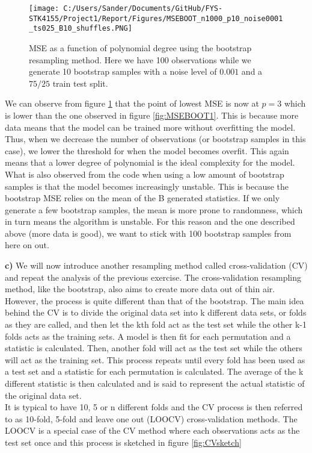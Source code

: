 \documentclass[12pt,a4paper]{article}
\begin{document}
\begin{figure}[H]
\centering
\texttt{[image: C:/Users/Sander/Documents/GitHub/FYS-STK4155/Project1/Report/Figures/MSEBOOT\_n1000\_p10\_noise0001\_ts025\_B10\_shuffles.PNG]}
\caption{\label{fig:MSEBOOT2} MSE as a function of polynomial degree using the bootstrap resampling method. Here we have 100 observations while we generate 10 bootstrap samples with a noise level of $0.001$ and a $75/25$ train test split.}
\end{figure}

\noindent We can observe from figure \ref{fig:MSEBOOT2} that the point of lowest MSE is now at $p = 3$ which is lower than the one observed in figure \ref{fig:MSEBOOT1}. This is because more data means that the model can be trained more without overfitting the model. Thus, when we decrease the number of observations (or bootstrap samples in this case), we lower the threshold for when the model becomes overfit. This again means that a lower degree of polynomial is the ideal complexity for the model. 
\\
What is also observed from the code when using a low amount of bootstrap samples is that the model becomes increasingly unstable. This is because the bootstrap MSE relies on the mean of the B generated statistics. If we only generate a few bootstrap samples, the mean is more prone to randomness, which in turn means the algorithm is unstable. For this reason and the one described above (more data is good), we want to stick with 100 bootstrap samples from here on out.

\newpage

\noindent \textbf{c)} We will now introduce another resampling method called cross-validation (CV) and repeat the analysis of the previous exercise. The cross-validation resampling method, like the bootstrap, also aims to create more data out of thin air. However, the process is quite different than that of the bootstrap. The main idea behind the CV is to divide the original data set into k different data sets, or folds as they are called, and then let the kth fold act as the test set while the other k-1 folds acts as the training sets. A model is then fit for each permutation and a statistic is calculated. Then, another fold will act as the test set while the others will act as the training set. This process repeats until every fold has been used as a test set and a statistic for each permutation is calculated. The average of the k different statistic is then calculated and is said to represent the actual statistic of the original data set. 
\\
It is typical to have 10, 5 or n different folds and the CV process is then referred to as 10-fold, 5-fold and leave one out (LOOCV) cross-validation methods. The LOOCV is a special case of the CV method where each observations acts as the test set once and this process is sketched in figure \ref{fig:CVsketch}
\end{document}
